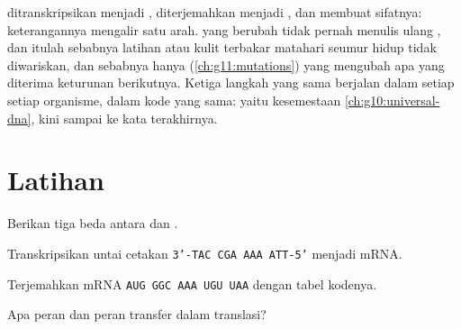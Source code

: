 \begin{remark}\label{rem:g11:gene-expression:flow}
 ditranskripsikan menjadi ,  diterjemahkan menjadi ,
dan  membuat sifatnya: keterangannya mengalir satu arah. 
yang berubah tidak pernah menulis ulang , dan itulah sebabnya
latihan atau kulit terbakar matahari seumur hidup tidak diwariskan, dan
sebabnya hanya   (\cref{ch:g11:mutations}) yang mengubah apa
yang diterima keturunan berikutnya. Ketiga langkah yang sama berjalan
dalam setiap  setiap organisme, dalam kode yang sama: yaitu
kesemestaan \cref{ch:g10:universal-dna}, kini sampai ke kata terakhirnya.
\end{remark}

\section{Latihan}

\begin{exercise}[$\star$]\label{exo:g11:gene-expression:1}
Berikan tiga beda antara  dan .
\end{exercise}

\begin{exercise}[$\star$]\label{exo:g11:gene-expression:2}
Transkripsikan untai cetakan \texttt{3'-TAC CGA AAA ATT-5'} menjadi
mRNA.
\end{exercise}

\begin{exercise}[$\star$]\label{exo:g11:gene-expression:3}
Terjemahkan mRNA \texttt{AUG GGC AAA UGU UAA} dengan tabel kodenya.
\end{exercise}

\begin{exercise}[$\star$]\label{exo:g11:gene-expression:4}
Apa peran  dan peran  transfer dalam translasi?
\end{exercise}

